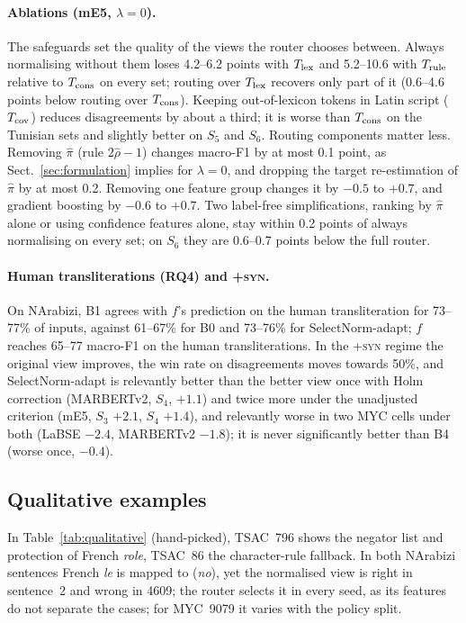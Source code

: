 \label{sec:normaliser}
\paragraph{Ablations (mE5, $\lambda=0$).} The safeguards set the quality of the views the router chooses between. Always normalising without them loses 4.2--6.2 points with $T_{\rm lex}$ and 5.2--10.6 with $T_{\rm rule}$ relative to $T_{\rm cons}$ on every set; routing over $T_{\rm lex}$ recovers only part of it (0.6--4.6 points below routing over $T_{\rm cons}$). Keeping out-of-lexicon tokens in Latin script ($T_{\rm cov}$) reduces disagreements by about a third; it is worse than $T_{\rm cons}$ on the Tunisian sets and slightly better on $S_5$ and $S_6$. Routing components matter less. Removing $\hat\pi$ (rule $2\hat\rho-1$) changes macro-F1 by at most 0.1 point, as Sect.~\ref{sec:formulation} implies for $\lambda=0$, and dropping the target re-estimation of $\hat\pi$ by at most 0.2. Removing one feature group changes it by $-0.5$ to $+0.7$, and gradient boosting by $-0.6$ to $+0.7$. Two label-free simplifications, ranking by $\hat\pi$ alone or using confidence features alone, stay within 0.2 points of always normalising on every set; on $S_6$ they are 0.6--0.7 points below the full router. \paragraph{Human transliterations (RQ4) and \textsc{+syn}.} On NArabizi, B1 agrees with $f$'s prediction on the human transliteration for 73--77\% of inputs, against 61--67\% for B0 and 73--76\% for SelectNorm-adapt; $f$ reaches 65--77 macro-F1 on the human transliterations. In the \textsc{+syn} regime the original view improves, the win rate on disagreements moves towards 50\%, and SelectNorm-adapt is relevantly better than the better view once with Holm correction (MARBERTv2, $S_4$, $+1.1$) and twice more under the unadjusted criterion (mE5, $S_3$ $+2.1$, $S_4$ $+1.4$), and relevantly worse in two MYC cells under both (LaBSE $-2.4$, MARBERTv2 $-1.8$); it is never significantly better than B4 (worse once, $-0.4$).

\subsection{Qualitative examples}
\label{sec:qualitative}

In Table~\ref{tab:qualitative} (hand-picked), TSAC~796 shows the negator list and protection of French \textit{role}, TSAC~86 the character-rule fallback. In both NArabizi sentences French \textit{le} is mapped to  (\textit{no}), yet the normalised view is right in sentence~2 and wrong in 4609; the router selects it in every seed, as its features do not separate the cases; for MYC~9079 it varies with the policy split.
